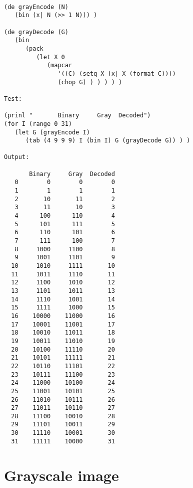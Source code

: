 \begin{verbatim}

(de grayEncode (N)
   (bin (x| N (>> 1 N))) )

(de grayDecode (G)
   (bin
      (pack
         (let X 0
            (mapcar
               '((C) (setq X (x| X (format C))))
               (chop G) ) ) ) ) )

Test:

(prinl "       Binary     Gray  Decoded")
(for I (range 0 31)
   (let G (grayEncode I)
      (tab (4 9 9 9) I (bin I) G (grayDecode G)) ) )

Output:

       Binary     Gray  Decoded
   0        0        0        0
   1        1        1        1
   2       10       11        2
   3       11       10        3
   4      100      110        4
   5      101      111        5
   6      110      101        6
   7      111      100        7
   8     1000     1100        8
   9     1001     1101        9
  10     1010     1111       10
  11     1011     1110       11
  12     1100     1010       12
  13     1101     1011       13
  14     1110     1001       14
  15     1111     1000       15
  16    10000    11000       16
  17    10001    11001       17
  18    10010    11011       18
  19    10011    11010       19
  20    10100    11110       20
  21    10101    11111       21
  22    10110    11101       22
  23    10111    11100       23
  24    11000    10100       24
  25    11001    10101       25
  26    11010    10111       26
  27    11011    10110       27
  28    11100    10010       28
  29    11101    10011       29
  30    11110    10001       30
  31    11111    10000       31

\end{verbatim}

\section*{Grayscale image}

